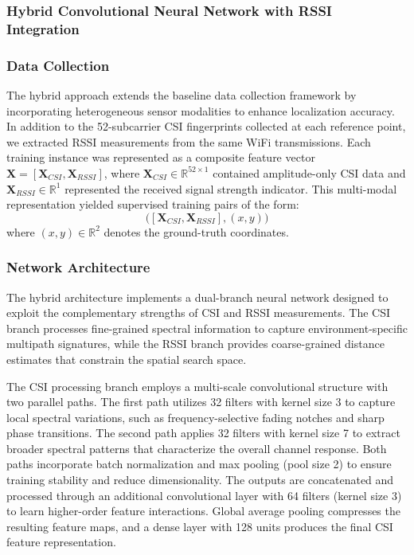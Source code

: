 


\subsubsection{Hybrid Convolutional Neural Network with RSSI Integration}

\subsubsection{Data Collection}
The hybrid approach extends the baseline data collection framework by incorporating heterogeneous sensor modalities to enhance localization accuracy. In addition to the 52-subcarrier CSI fingerprints collected at each reference point, we extracted RSSI measurements from the same WiFi transmissions. Each training instance was represented as a composite feature vector $\mathbf{X} = [\mathbf{X}_{CSI}, \mathbf{X}_{RSSI}]$, where $\mathbf{X}_{CSI} \in \mathbb{R}^{52 \times 1}$ contained amplitude-only CSI data and $\mathbf{X}_{RSSI} \in \mathbb{R}^{1}$ represented the received signal strength indicator. This multi-modal representation yielded supervised training pairs of the form:
\begin{equation}\label{eq:hybrid_training}
\big([\mathbf{X}_{CSI}, \mathbf{X}_{RSSI}], (x,y)\big)
\end{equation}
where $(x,y) \in \mathbb{R}^2$ denotes the ground-truth coordinates.

\subsubsection{Network Architecture}
The hybrid architecture implements a dual-branch neural network designed to exploit the complementary strengths of CSI and RSSI measurements. The CSI branch processes fine-grained spectral information to capture environment-specific multipath signatures, while the RSSI branch provides coarse-grained distance estimates that constrain the spatial search space.

The CSI processing branch employs a multi-scale convolutional structure with two parallel paths. The first path utilizes 32 filters with kernel size 3 to capture local spectral variations, such as frequency-selective fading notches and sharp phase transitions. The second path applies 32 filters with kernel size 7 to extract broader spectral patterns that characterize the overall channel response. Both paths incorporate batch normalization and max pooling (pool size 2) to ensure training stability and reduce dimensionality. The outputs are concatenated and processed through an additional convolutional layer with 64 filters (kernel size 3) to learn higher-order feature interactions. Global average pooling compresses the resulting feature maps, and a dense layer with 128 units produces the final CSI feature representation.

